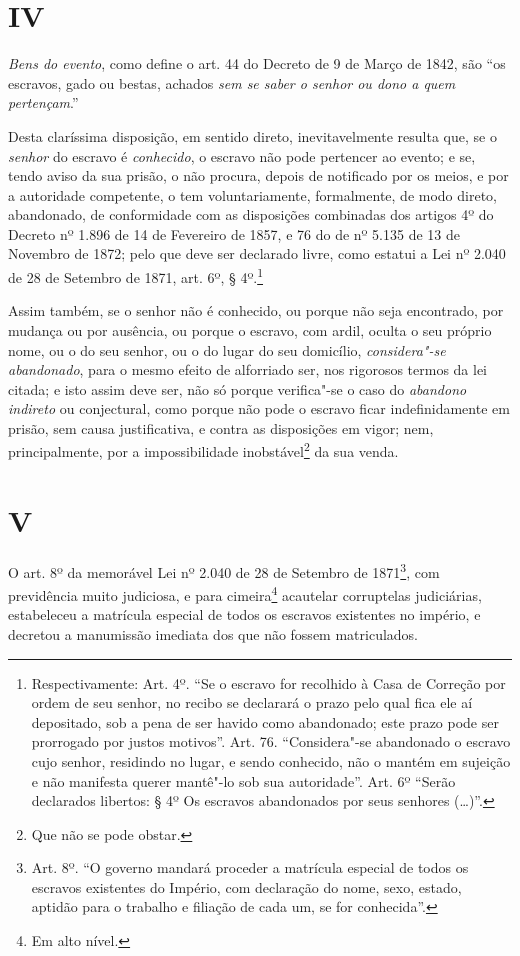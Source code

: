 \section*{IV}

\emph{Bens do evento}, como define o art. 44 do Decreto de 9 de Março de
1842, são ``os escravos, gado ou bestas, achados \emph{sem se saber o
senhor ou dono a quem pertençam}.''

Desta claríssima disposição, em sentido direto, inevitavelmente resulta
que, se o \emph{senhor} do escravo é \emph{conhecido}, o escravo não
pode pertencer ao evento; e se, tendo aviso da sua prisão, o não
procura, depois de notificado por os meios, e por a autoridade
competente, o tem voluntariamente, formalmente, de modo direto,
abandonado, de conformidade com as disposições combinadas dos artigos 4º
do Decreto nº 1.896 de 14 de Fevereiro de 1857, e 76 do de nº 5.135 de
13 de Novembro de 1872; pelo que deve ser declarado livre, como estatui
a Lei nº 2.040 de 28 de Setembro de 1871, art. 6º, § 4º.\footnote{
  Respectivamente: Art. 4º. ``Se o escravo for recolhido à Casa de
  Correção por ordem de seu senhor, no recibo se declarará o prazo pelo
  qual fica ele aí depositado, sob a pena de ser havido como abandonado;
  este prazo pode ser prorrogado por justos motivos''. Art. 76.
  ``Considera"-se abandonado o escravo cujo senhor, residindo no lugar, e
  sendo conhecido, não o mantém em sujeição e não manifesta querer
  mantê"-lo sob sua autoridade''. Art. 6º ``Serão declarados libertos: § 4º
  Os escravos abandonados por seus senhores (\ldots{})''.}

Assim também, se o senhor não é conhecido, ou porque não seja
encontrado, por mudança ou por ausência, ou porque o escravo, com ardil,
oculta o seu próprio nome, ou o do seu senhor, ou o do lugar do seu
domicílio, \emph{considera"-se abandonado}, para o mesmo efeito de
alforriado ser, nos rigorosos termos da lei citada; e isto assim deve
ser, não só porque verifica"-se o caso do \emph{abandono indireto} ou
conjectural, como porque não pode o escravo ficar indefinidamente em
prisão, sem causa justificativa, e contra as disposições em vigor; nem,
principalmente, por a impossibilidade inobstável\footnote{Que não se
  pode obstar.} da sua venda.

\section*{V}

O art. 8º da memorável Lei nº 2.040 de 28 de Setembro de 1871\footnote{
  Art. 8º. ``O governo mandará proceder a matrícula especial de todos os
  escravos existentes do Império, com declaração do nome, sexo, estado,
  aptidão para o trabalho e filiação de cada um, se for conhecida''.}, com
previdência muito judiciosa, e para cimeira\footnote{Em alto nível.}
acautelar corruptelas judiciárias, estabeleceu a matrícula especial de
todos os escravos existentes no império, e decretou a manumissão
imediata dos que não fossem matriculados.

